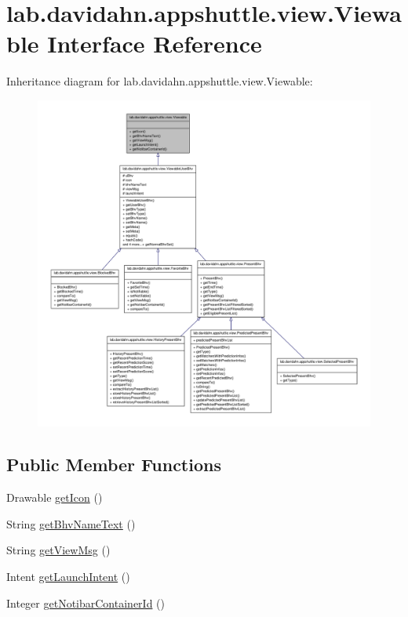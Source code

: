 \hypertarget{interfacelab_1_1davidahn_1_1appshuttle_1_1view_1_1_viewable}{\section{lab.\-davidahn.\-appshuttle.\-view.\-Viewable \-Interface \-Reference}
\label{interfacelab_1_1davidahn_1_1appshuttle_1_1view_1_1_viewable}
}


\-Inheritance diagram for lab.\-davidahn.\-appshuttle.\-view.\-Viewable\-:
\nopagebreak
\begin{figure}[H]
\begin{center}
\leavevmode
\includegraphics[width=350pt]{interfacelab_1_1davidahn_1_1appshuttle_1_1view_1_1_viewable__inherit__graph}
\end{center}
\end{figure}
\subsection*{\-Public \-Member \-Functions}
\begin{DoxyCompactItemize}
\item 
\-Drawable \hyperlink{interfacelab_1_1davidahn_1_1appshuttle_1_1view_1_1_viewable_ad6d1ee2a4eb24922d325f0e1f60f4a49}{get\-Icon} ()
\item 
\-String \hyperlink{interfacelab_1_1davidahn_1_1appshuttle_1_1view_1_1_viewable_aa15d4dc8b74460430f52283432247916}{get\-Bhv\-Name\-Text} ()
\item 
\-String \hyperlink{interfacelab_1_1davidahn_1_1appshuttle_1_1view_1_1_viewable_a9d6207041e60183f60b79079ba8c7be8}{get\-View\-Msg} ()
\item 
\-Intent \hyperlink{interfacelab_1_1davidahn_1_1appshuttle_1_1view_1_1_viewable_a7520365b0ab387695c235d5eacf2ba28}{get\-Launch\-Intent} ()
\item 
\-Integer \hyperlink{interfacelab_1_1davidahn_1_1appshuttle_1_1view_1_1_viewable_a1edc25ec862bc072cb89de8257c8af31}{get\-Notibar\-Container\-Id} ()
\end{DoxyCompactItemize}


